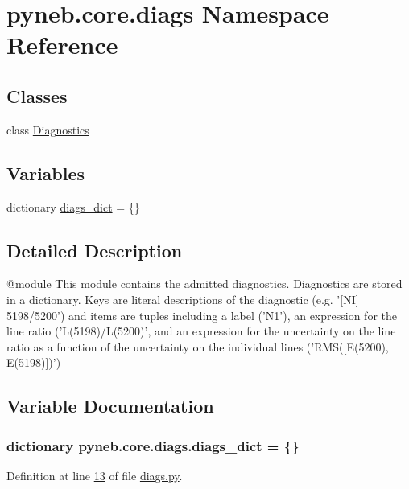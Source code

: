 \hypertarget{namespacepyneb_1_1core_1_1diags}{\section{pyneb.\-core.\-diags Namespace Reference}
\label{namespacepyneb_1_1core_1_1diags}
}
\subsection*{Classes}
\begin{DoxyCompactItemize}
\item 
class \hyperlink{classpyneb_1_1core_1_1diags_1_1_diagnostics}{Diagnostics}
\end{DoxyCompactItemize}
\subsection*{Variables}
\begin{DoxyCompactItemize}
\item 
dictionary \hyperlink{namespacepyneb_1_1core_1_1diags_a68f98ce12c5564de62b67feff671dc98}{diags\-\_\-dict} = \{\}
\end{DoxyCompactItemize}


\subsection{Detailed Description}
\begin{DoxyVerb}@module
This module contains the admitted diagnostics.
Diagnostics are stored in a dictionary. Keys are literal descriptions of the diagnostic 
(e.g. '[NI] 5198/5200') and items are tuples including a label ('N1'), an expression for the line ratio ('L(5198)/L(5200)',
and an expression for the uncertainty on the line ratio as a function of the uncertainty on the individual lines ('RMS([E(5200), E(5198)])')\end{DoxyVerb}
 

\subsection{Variable Documentation}
\hypertarget{namespacepyneb_1_1core_1_1diags_a68f98ce12c5564de62b67feff671dc98}{
\subsubsection[{diags\-\_\-dict}]{\setlength{\rightskip}{0pt plus 5cm}dictionary pyneb.\-core.\-diags.\-diags\-\_\-dict = \{\}}}\label{namespacepyneb_1_1core_1_1diags_a68f98ce12c5564de62b67feff671dc98}


Definition at line \hyperlink{diags_8py_source_l00013}{13} of file \hyperlink{diags_8py_source}{diags.\-py}.

